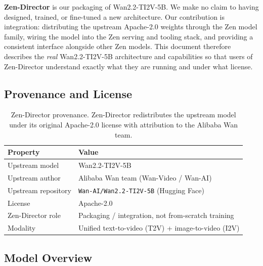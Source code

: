 \documentclass[11pt,a4paper]{article}
\begin{document}
\textbf{Zen-Director} is our packaging of Wan2.2-TI2V-5B. We make no claim to having designed,
trained, or fine-tuned a new architecture. Our contribution is integration: distributing the
upstream Apache-2.0 weights through the Zen model family, wiring the model into the Zen serving
and tooling stack, and providing a consistent interface alongside other Zen models. This
document therefore describes the \emph{real} Wan2.2-TI2V-5B architecture and capabilities so
that users of Zen-Director understand exactly what they are running and under what license.

\subsection{Provenance and License}

\begin{table}[H]
\centering
\begin{tabular}{ll}
\toprule
\textbf{Property} & \textbf{Value} \\
\midrule
Upstream model & Wan2.2-TI2V-5B \\
Upstream author & Alibaba Wan team (Wan-Video / Wan-AI) \\
Upstream repository & \texttt{Wan-AI/Wan2.2-TI2V-5B} (Hugging Face) \\
License & Apache-2.0 \\
Zen-Director role & Packaging / integration, not from-scratch training \\
Modality & Unified text-to-video (T2V) + image-to-video (I2V) \\
\bottomrule
\end{tabular}
\caption{Zen-Director provenance. Zen-Director redistributes the upstream model under its
original Apache-2.0 license with attribution to the Alibaba Wan team.}
\end{table}

\subsection{Model Overview}
\end{document}
